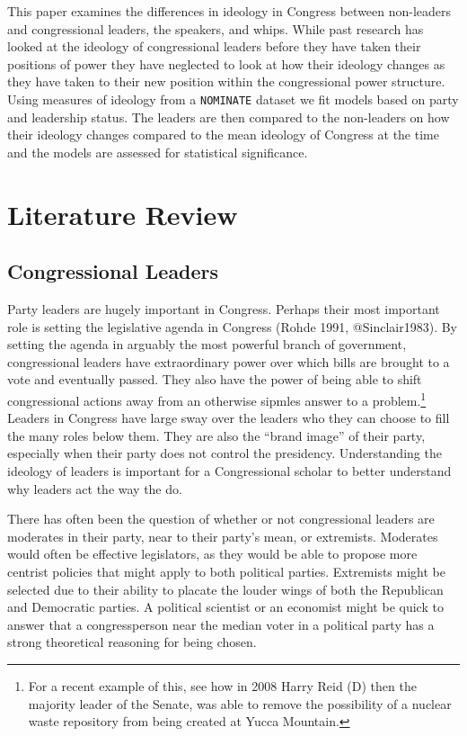 \documentclass[12pt,twoside]{reedthesis}
\begin{document}
  This paper examines the differences in ideology in Congress between
  non-leaders and congressional leaders, the speakers, and whips. While
  past research has looked at the ideology of congressional leaders before
  they have taken their positions of power they have neglected to look at
  how their ideology changes as they have taken to their new position
  within the congressional power structure. Using measures of ideology
  from a \texttt{NOMINATE} dataset we fit models based on party and
  leadership status. The leaders are then compared to the non-leaders on
  how their ideology changes compared to the mean ideology of Congress at
  the time and the models are assessed for statistical significance.
  
  \chapter{Literature Review}\label{literature-review}
  
  \section{Congressional Leaders}\label{congressional-leaders}
  
  Party leaders are hugely important in Congress. Perhaps their most
  important role is setting the legislative agenda in Congress (Rohde
  1991, @Sinclair1983). By setting the agenda in arguably the most
  powerful branch of government, congressional leaders have extraordinary
  power over which bills are brought to a vote and eventually passed. They
  also have the power of being able to shift congressional actions away
  from an otherwise sipmles answer to a problem.\footnote{For a recent
    example of this, see how in 2008 Harry Reid (D) then the majority
    leader of the Senate, was able to remove the possibility of a nuclear
    waste repository from being created at Yucca Mountain.} Leaders in
  Congress have large sway over the leaders who they can choose to fill
  the many roles below them. They are also the ``brand image'' of their
  party, especially when their party does not control the presidency.
  Understanding the ideology of leaders is important for a Congressional
  scholar to better understand why leaders act the way the do.
  
  There has often been the question of whether or not congressional
  leaders are moderates in their party, near to their party's mean, or
  extremists. Moderates would often be effective legislators, as they
  would be able to propose more centrist policies that might apply to both
  political parties. Extremists might be selected due to their ability to
  placate the louder wings of both the Republican and Democratic parties.
  A political scientist or an economist might be quick to answer that a
  congressperson near the median voter in a political party has a strong
  theoretical reasoning for being chosen.
  
\end{document}
